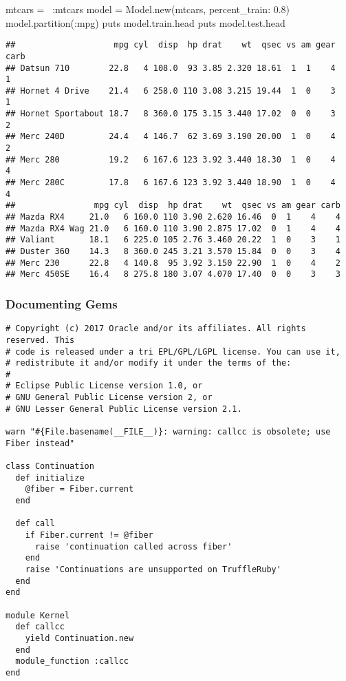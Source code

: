 \documentclass[]{article}
\newenvironment{Shaded}{\begin{snugshade}}{\end{snugshade}}
\newcommand{\DataTypeTok}[1]{\textcolor[rgb]{0.13,0.29,0.53}{#1}}
\newcommand{\FloatTok}[1]{\textcolor[rgb]{0.00,0.00,0.81}{#1}}
\newcommand{\StringTok}[1]{\textcolor[rgb]{0.31,0.60,0.02}{#1}}
\newcommand{\NormalTok}[1]{#1}
\begin{document}
\begin{Shaded}
\begin{Highlighting}[]
\NormalTok{mtcars = ~}\StringTok{:mtcars}
\NormalTok{model = }\DataTypeTok{Model}\NormalTok{.new(mtcars, }\StringTok{percent_train: }\FloatTok{0.8}\NormalTok{)}
\NormalTok{model.partition(}\StringTok{:mpg}\NormalTok{)}
\NormalTok{puts model.train.head}
\NormalTok{puts model.test.head}
\end{Highlighting}
\end{Shaded}

\begin{verbatim}
##                    mpg cyl  disp  hp drat    wt  qsec vs am gear carb
## Datsun 710        22.8   4 108.0  93 3.85 2.320 18.61  1  1    4    1
## Hornet 4 Drive    21.4   6 258.0 110 3.08 3.215 19.44  1  0    3    1
## Hornet Sportabout 18.7   8 360.0 175 3.15 3.440 17.02  0  0    3    2
## Merc 240D         24.4   4 146.7  62 3.69 3.190 20.00  1  0    4    2
## Merc 280          19.2   6 167.6 123 3.92 3.440 18.30  1  0    4    4
## Merc 280C         17.8   6 167.6 123 3.92 3.440 18.90  1  0    4    4
##                mpg cyl  disp  hp drat    wt  qsec vs am gear carb
## Mazda RX4     21.0   6 160.0 110 3.90 2.620 16.46  0  1    4    4
## Mazda RX4 Wag 21.0   6 160.0 110 3.90 2.875 17.02  0  1    4    4
## Valiant       18.1   6 225.0 105 2.76 3.460 20.22  1  0    3    1
## Duster 360    14.3   8 360.0 245 3.21 3.570 15.84  0  0    3    4
## Merc 230      22.8   4 140.8  95 3.92 3.150 22.90  1  0    4    2
## Merc 450SE    16.4   8 275.8 180 3.07 4.070 17.40  0  0    3    3
\end{verbatim}

\subsubsection{Documenting Gems}\label{documenting-gems}

\begin{verbatim}
# Copyright (c) 2017 Oracle and/or its affiliates. All rights reserved. This
# code is released under a tri EPL/GPL/LGPL license. You can use it,
# redistribute it and/or modify it under the terms of the:
#
# Eclipse Public License version 1.0, or
# GNU General Public License version 2, or
# GNU Lesser General Public License version 2.1.

warn "#{File.basename(__FILE__)}: warning: callcc is obsolete; use Fiber instead"

class Continuation
  def initialize
    @fiber = Fiber.current
  end

  def call
    if Fiber.current != @fiber
      raise 'continuation called across fiber'
    end
    raise 'Continuations are unsupported on TruffleRuby'
  end
end

module Kernel
  def callcc
    yield Continuation.new
  end
  module_function :callcc
end
\end{verbatim}
\end{document}
